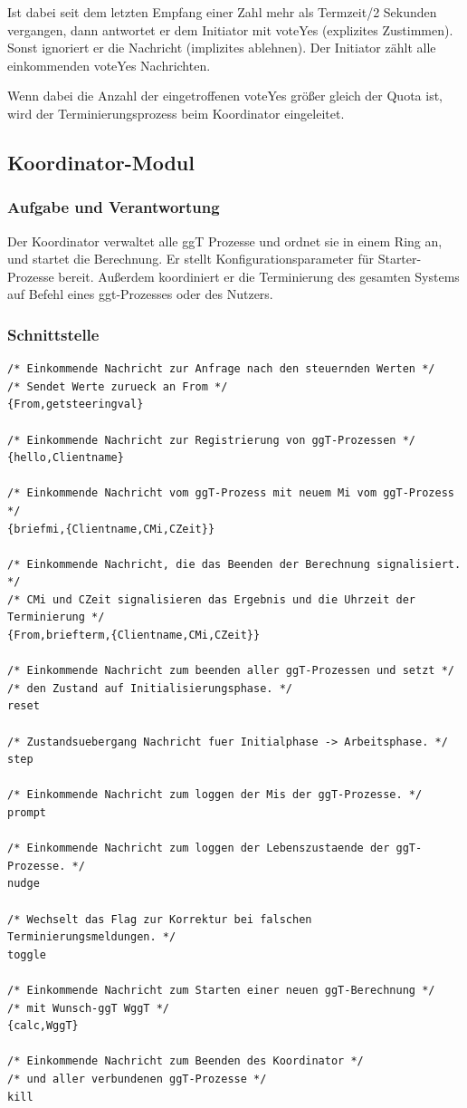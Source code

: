 \documentclass{article}
\begin{document}
Ist dabei seit dem letzten Empfang einer Zahl mehr als Termzeit/2 Sekunden vergangen, dann antwortet er dem Initiator
mit voteYes (explizites Zustimmen). Sonst ignoriert er die Nachricht (implizites ablehnen). Der Initiator zählt alle
einkommenden voteYes Nachrichten.

Wenn dabei die Anzahl der eingetroffenen voteYes größer gleich der Quota ist, wird der Terminierungsprozess beim
Koordinator eingeleitet.
\newpage

\subsection{Koordinator-Modul}
\subsubsection{Aufgabe und Verantwortung}
Der Koordinator verwaltet alle ggT Prozesse und ordnet sie in einem Ring an, und startet die Berechnung.
Er stellt Konfigurationsparameter für Starter-Prozesse bereit. Außerdem koordiniert er die Terminierung des
gesamten Systems auf Befehl eines ggt-Prozesses oder des Nutzers.

\subsubsection{Schnittstelle}
\begin{lstlisting}
/* Einkommende Nachricht zur Anfrage nach den steuernden Werten */
/* Sendet Werte zurueck an From */
{From,getsteeringval}

/* Einkommende Nachricht zur Registrierung von ggT-Prozessen */
{hello,Clientname}

/* Einkommende Nachricht vom ggT-Prozess mit neuem Mi vom ggT-Prozess */
{briefmi,{Clientname,CMi,CZeit}}

/* Einkommende Nachricht, die das Beenden der Berechnung signalisiert. */
/* CMi und CZeit signalisieren das Ergebnis und die Uhrzeit der Terminierung */
{From,briefterm,{Clientname,CMi,CZeit}}

/* Einkommende Nachricht zum beenden aller ggT-Prozessen und setzt */
/* den Zustand auf Initialisierungsphase. */
reset

/* Zustandsuebergang Nachricht fuer Initialphase -> Arbeitsphase. */
step

/* Einkommende Nachricht zum loggen der Mis der ggT-Prozesse. */
prompt

/* Einkommende Nachricht zum loggen der Lebenszustaende der ggT-Prozesse. */
nudge

/* Wechselt das Flag zur Korrektur bei falschen Terminierungsmeldungen. */
toggle

/* Einkommende Nachricht zum Starten einer neuen ggT-Berechnung */
/* mit Wunsch-ggT WggT */
{calc,WggT}

/* Einkommende Nachricht zum Beenden des Koordinator */
/* und aller verbundenen ggT-Prozesse */
kill
\end{lstlisting}
\end{document}
